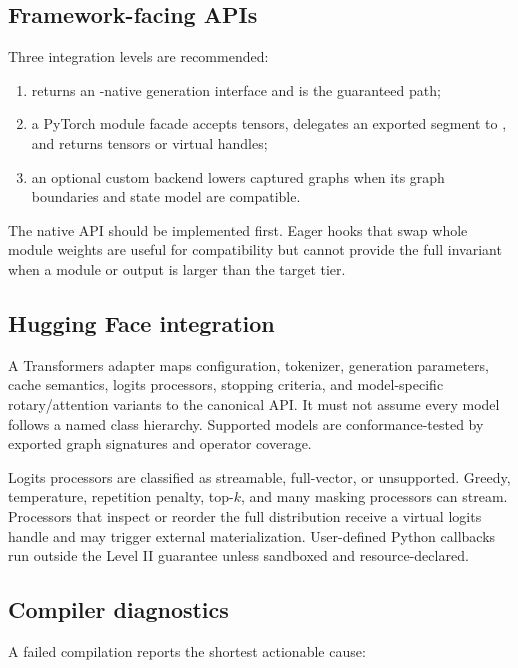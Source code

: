 \subsection{Framework-facing APIs}

Three integration levels are recommended:

\begin{enumerate}
  \item {} returns an \AMS-native generation interface and is the guaranteed path;
  \item a PyTorch module facade accepts tensors, delegates an exported segment to \AMS, and returns tensors or virtual handles;
  \item an optional  custom backend lowers captured graphs when its graph boundaries and state model are compatible.
\end{enumerate}

The native API should be implemented first. Eager hooks that swap whole module weights are useful for compatibility but cannot provide the full invariant when a module or output is larger than the target tier.

\subsection{Hugging Face integration}

A Transformers adapter maps configuration, tokenizer, generation parameters, cache semantics, logits processors, stopping criteria, and model-specific rotary/attention variants to the canonical API. It must not assume every model follows a named class hierarchy. Supported models are conformance-tested by exported graph signatures and operator coverage.

Logits processors are classified as streamable, full-vector, or unsupported. Greedy, temperature, repetition penalty, top-$k$, and many masking processors can stream. Processors that inspect or reorder the full distribution receive a virtual logits handle and may trigger external materialization. User-defined Python callbacks run outside the Level II guarantee unless sandboxed and resource-declared.

\subsection{Compiler diagnostics}

A failed compilation reports the shortest actionable cause:

